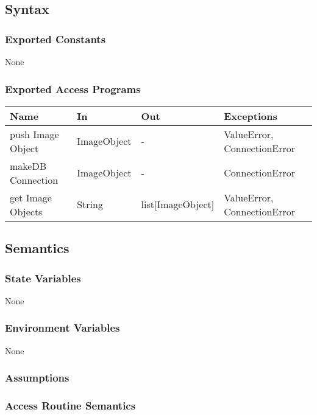 \documentclass[12pt, titlepage]{article}
\begin{document}
  
  \subsection{Syntax}


  
  \subsubsection{Exported Constants}
  None
  \subsubsection{Exported Access Programs}
  
  \begin{center}
  \begin{tabular}{p{2cm} p{4cm} p{4cm} p{2cm}}
  \hline
  \textbf{Name} & \textbf{In} & \textbf{Out} & \textbf{Exceptions} \\
  \hline
  push Image Object & ImageObject & - & ValueError, ConnectionError \\
  \hline
  makeDB Connection & ImageObject & - & ConnectionError \\
  \hline
  get Image Objects & String & list[ImageObject] & ValueError, ConnectionError \\
  \hline
  \end{tabular}
  \end{center}
  
  \subsection{Semantics}
  
  \subsubsection{State Variables}
  
  None
  
  \subsubsection{Environment Variables}
  
  None
  
  \subsubsection{Assumptions}
  
  
  \subsubsection{Access Routine Semantics}
  
\end{document}
